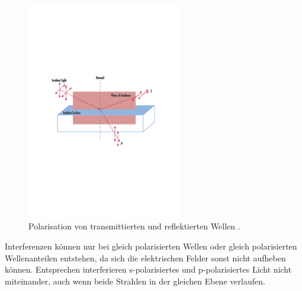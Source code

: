 \begin{figure}[!ht]
	\centering
	\includegraphics[width=0.6\textwidth]{content/images/sundppol.pdf}
    \caption{Polarisation von transmittierten und reflektierten Wellen \cite{edmund}.}
    \label{fig:linpol}
\end{figure}


Interferenzen können nur bei gleich polarisierten Wellen oder gleich polarisierten Wellenanteilen entstehen, da sich die elektrischen Felder sonst nicht aufheben können.
Entsprechen interferieren s-polarisiertes und p-polarisiertes Licht nicht miteinander, auch wenn beide Strahlen in der gleichen Ebene verlaufen.


